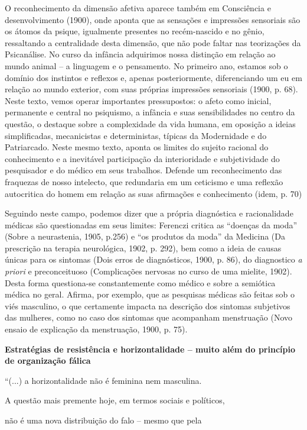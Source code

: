 O reconhecimento da dimensão afetiva aparece também em Consciência e
desenvolvimento (1900), onde aponta que as sensações e impressões
sensoriais são os átomos da psique, igualmente presentes no
recém-nascido e no gênio, ressaltando a centralidade desta dimensão, que
não pode faltar nas teorizações da Psicanálise. No curso da infância
adquirimos nossa distinção em relação ao mundo animal -- a linguagem e o
pensamento. No primeiro ano, estamos sob o domínio dos instintos e
reflexos e, apenas posteriormente, diferenciando um eu em relação ao
mundo exterior, com suas próprias impressões sensoriais (1900, p. 68).
Neste texto, vemos operar importantes pressupostos: o afeto como
inicial, permanente e central no psiquismo, a infância e suas
sensibilidades no centro da questão, o destaque sobre a complexidade da
vida humana, em oposição a ideias simplificadas, mecanicistas e
deterministas, típicas da Modernidade e do Patriarcado. Neste mesmo
texto, aponta os limites do sujeito racional do conhecimento e a
inevitável participação da interioridade e subjetividade do pesquisador
e do médico em seus trabalhos. Defende um reconhecimento das fraquezas
de nosso intelecto, que redundaria em um ceticismo e uma reflexão
autocritica do homem em relação as suas afirmações e conhecimento (idem,
p. 70)

Seguindo neste campo, podemos dizer que a própria diagnóstica e
racionalidade médicas são questionadas em seus limites: Ferenczi critica
as ``doenças da moda'' (Sobre a neurastenia, 1905, p.256) e ``os
produtos da moda'' da Medicina (Da prescrição na terapia neurológica,
1902, p. 292), bem como a ideia de causas únicas para os sintomas (Dois
erros de diagnósticos, 1900, p. 86), do diagnostico \emph{a priori} e
preconceituoso (Complicações nervosas no curso de uma mielite, 1902).
Desta forma questiona-se constantemente como médico e sobre a semiótica
médica no geral. Afirma, por exemplo, que as pesquisas médicas são
feitas sob o viés masculino, o que certamente impacta na descrição dos
sintomas subjetivos das mulheres, como no caso dos sintomas que
acompanham menstruação (Novo ensaio de explicação da menstruação, 1900,
p. 75).

\textbf{Estratégias de resistência e horizontalidade -- muito além do
princípio de organização fálica }

``(...) a horizontalidade não é feminina nem masculina.

A questão mais premente hoje, em termos sociais e políticos,

não é uma nova distribuição do falo -- mesmo que pela

